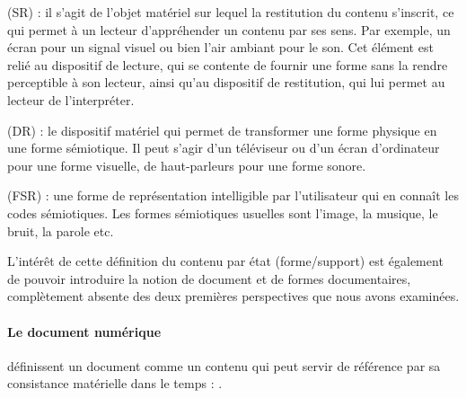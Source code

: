 \begin{listeni}
\begin{liste}
		\item {} (SR) : il s'agit de l'objet matériel sur lequel la restitution du contenu s'inscrit, ce qui permet à un lecteur d'appréhender un contenu par ses sens. 
		Par exemple, un écran pour un signal visuel ou bien l'air ambiant pour le son.
		Cet élément est relié au dispositif de lecture, qui se contente de fournir une forme sans la rendre perceptible à son lecteur, ainsi qu'au dispositif de restitution, qui lui permet au lecteur de l'interpréter.
		
		\item {} (DR) : le dispositif matériel qui permet de transformer une forme physique en une forme sémiotique.
		Il peut s'agir d'un téléviseur ou d'un écran d'ordinateur pour une forme visuelle, de haut-parleurs pour une forme sonore.
		
		\item {} (FSR) : une forme de représentation intelligible par l'utilisateur qui en connaît les codes sémiotiques.
		Les formes sémiotiques usuelles sont l'image, la musique, le bruit, la parole etc.
	\end{liste}
\end{listeni}

L'intérêt de cette définition du contenu par état (forme/support) est également de pouvoir introduire la notion de document et de formes documentaires, complètement absente des deux premières perspectives que nous avons examinées.


\paragraph{Le document numérique}
\cite{Morizet-mahoudeaux2005a} définissent un document comme un contenu qui peut servir de référence par sa consistance matérielle dans le temps : .


